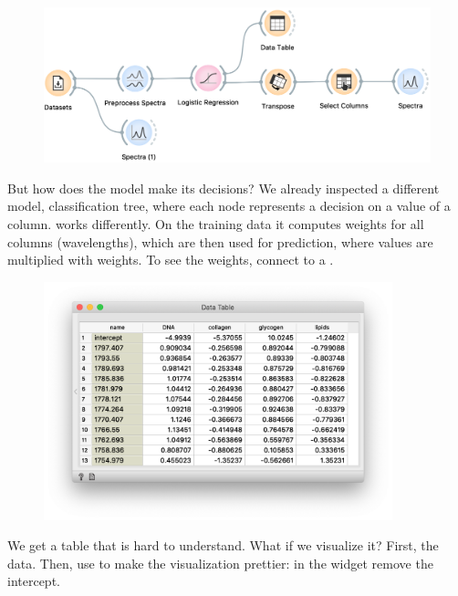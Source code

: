 \begin{figure}
  \centering
  \includegraphics[width=1.1\textwidth]{graphics/ch-spectra_classification/sp_classification-fig3.png}%
  \label{fig:spectra_classification-fig3}
\end{figure}
But how does the model make its decisions? We already inspected a different model, classification tree, where each node represents a decision on a value of a column.   works differently. On the training data it computes weights for all columns (wavelengths), which are then used for prediction, where values are multiplied with weights. To see the weights, connect  to a . 

\begin{figure}
  \vspace{-0.7cm}
  \includegraphics[width=0.9\textwidth]{graphics/ch-spectra_classification/sp_classification-fig4.png}
  \label{fig:spectra_classification-fig4}
\end{figure}
We get a table that is hard to understand. What if we visualize it? First,  the data. Then, use  to make the visualization prettier: in the widget remove the intercept.

